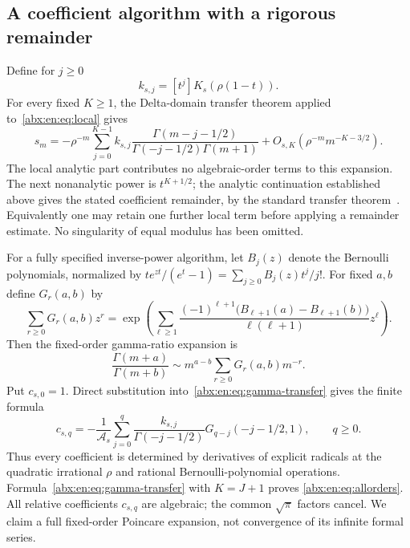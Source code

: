 \documentclass[11pt,letterpaper]{article}
\numberwithin{equation}{section}
\theoremstyle{remark}\newtheorem{remark}[theorem]{Remark}
\begin{document}
\subsection{A coefficient algorithm with a rigorous remainder}\label{abx:en:sub:algorithm}
Define for $j\ge0$
\[
 k_{s,j}=[t^j]K_s(\rho(1-t)).
\]
For every fixed $K\ge1$, the Delta-domain transfer theorem applied
to~\eqref{abx:en:eq:local} gives
\begin{equation}\label{abx:en:eq:gamma-transfer}
 s_m=-\rho^{-m}\sum_{j=0}^{K-1}k_{s,j}
  \frac{\Gamma(m-j-1/2)}{\Gamma(-j-1/2)\Gamma(m+1)}
    +O_{s,K}(\rho^{-m}m^{-K-3/2}).
\end{equation}
The local analytic part contributes no algebraic-order terms to this
expansion. The next nonanalytic power is $t^{K+1/2}$; the analytic
continuation established above gives the stated coefficient remainder,
by the standard transfer theorem~\cite[Chapter~VI]{FS}. Equivalently
one may retain one further local term before applying a remainder
estimate. No singularity of equal modulus has been omitted.

For a fully specified inverse-power algorithm, let $B_j(z)$ denote
the Bernoulli polynomials, normalized by
$te^{zt}/(e^t-1)=\sum_{j\ge0}B_j(z)t^j/j!$. For fixed $a,b$ define
$G_r(a,b)$ by
\begin{equation}\label{abx:en:eq:gammaG}
 \sum_{r\ge0}G_r(a,b)z^r
 =\exp\left(\sum_{\ell\ge1}
 \frac{(-1)^{\ell+1}\bigl(B_{\ell+1}(a)-B_{\ell+1}(b)\bigr)}
      {\ell(\ell+1)}z^\ell\right).
\end{equation}
Then the fixed-order gamma-ratio expansion is
\[
 \frac{\Gamma(m+a)}{\Gamma(m+b)}
  \sim m^{a-b}\sum_{r\ge0}G_r(a,b)m^{-r}.
\]
Put $c_{s,0}=1$. Direct substitution into~\eqref{abx:en:eq:gamma-transfer}
gives the finite formula
\begin{equation}\label{abx:en:eq:cs}
 c_{s,q}=-\frac1{\mathcal A_s}
 \sum_{j=0}^{q}\frac{k_{s,j}}{\Gamma(-j-1/2)}
             G_{q-j}(-j-1/2,1),\qquad q\ge0.
\end{equation}
Thus every coefficient is determined by derivatives of explicit radicals
at the quadratic irrational $\rho$ and rational Bernoulli-polynomial
operations. Formula~\eqref{abx:en:eq:gamma-transfer} with $K=J+1$ proves
\eqref{abx:en:eq:allorders}. All relative coefficients $c_{s,q}$ are algebraic;
the common $\sqrt\pi$ factors cancel. We claim a full fixed-order
Poincare expansion, not convergence of its infinite formal series.
\end{document}
